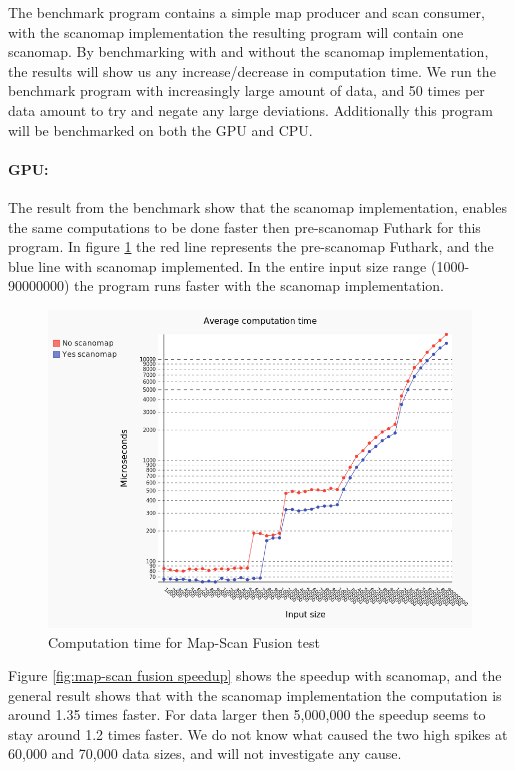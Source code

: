 \documentclass[11pt]{article}
\begin{document}
The benchmark program contains a simple map producer and scan consumer, with the scanomap implementation the resulting program will contain one scanomap. By benchmarking with and without the scanomap implementation, the results will show us any increase/decrease in computation time. We run the benchmark program with increasingly large amount of data, and 50 times per data amount to try and negate any large deviations. Additionally this program will be benchmarked on both the GPU and CPU. \\

\paragraph*{GPU:} The result from the benchmark show that the scanomap implementation, enables the same computations to be done faster then pre-scanomap Futhark for this program. In figure \ref{fig:map-scan fusion test} the red line represents the pre-scanomap Futhark, and the blue line with scanomap implemented. In the entire input size range (1000-90000000) the program runs faster with the scanomap implementation.

\begin{figure}[hb]
  \centering
    \includegraphics[width=1.0\textwidth]{images/chart.png}
  \caption{Computation time for Map-Scan Fusion test}
  \label{fig:map-scan fusion test}
\end{figure}

Figure \ref{fig:map-scan fusion speedup} shows the speedup with scanomap, and the general result shows that with the scanomap implementation the computation is around 1.35 times faster. For data larger then 5,000,000 the speedup seems to stay around 1.2 times faster. We do not know what caused the two high spikes at 60,000 and 70,000 data sizes, and will not investigate any cause.
\end{document}

